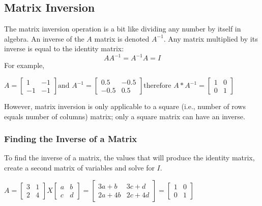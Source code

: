 \documentclass[11pt,openany]{book}\usepackage[]{graphicx}\usepackage[]{color}
\begin{document}
\subsection{Matrix Inversion}

The matrix inversion operation is a bit like dividing any number by itself in algebra. An inverse of the $A$ matrix is denoted $A^{-1}$. Any matrix multiplied by its inverse is equal to the identity matrix: 
\begin{equation*}
  AA^{-1} = A^{-1}A = I 
\end{equation*}
For example, 

$A = 
\begin{bmatrix}
  1 & -1 \\
  -1 & -1 
\end{bmatrix}
\text{and } 
A^{-1} = 
\begin{bmatrix}
  0.5 & -0.5 \\
  -0.5 & 0.5 
\end{bmatrix}
\text{therefore }  
A*A^{-1} = 
\begin{bmatrix}
  1 & 0 \\
  0 & 1
\end{bmatrix}$

However, matrix inversion is only applicable to a square (i.e., number of rows equals number of columns) matrix; only a square matrix can have an inverse.

\subsubsection{Finding the Inverse of a Matrix}

To find the inverse of a matrix, the values that will produce the identity matrix, create a second matrix of variables and solve for $I$.

$A = 
\begin{bmatrix}
  3 & 1 \\
  2 & 4 
\end{bmatrix}
X
\begin{bmatrix}
a & b \\
c & d 
\end{bmatrix}
=
\begin{bmatrix}
 3a+b & 3c+d \\
 2a+4b & 2c+4d
\end{bmatrix}
=
\begin{bmatrix}
  1 & 0 \\
  0 & 1
\end{bmatrix}$
\end{document}
